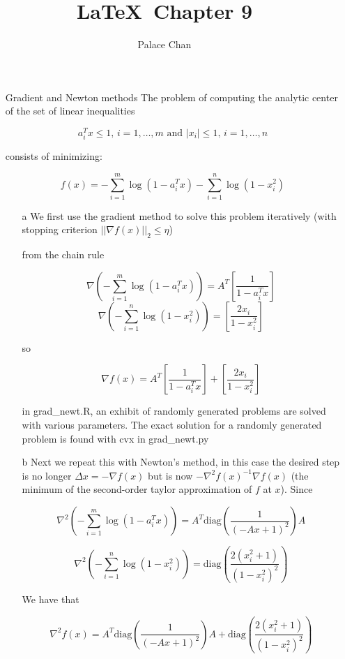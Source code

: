 \documentclass[12pt]{article}
\title{\LaTeX\ Chapter 9}
\author{Palace Chan}
\begin{document}
\maketitle
\newpage

\begin{itemize}

\item[Gradient and Newton methods]
  The problem of computing the analytic center of the set of linear inequalities

  $$a_i^T x \leq 1 \text{,    } i = 1,\ldots,m \text{  and  } |x_i| \leq 1 \text{,    } i = 1,\ldots,n$$

  consists of minimizing:

  $$f(x) = - \sum_{i=1}^m \log (1 - a_i^T x) - \sum_{i=1}^n \log (1 - x_i^2)$$

  \begin{itemize}
  \item[a]
    We first use the gradient method to solve this problem iteratively (with stopping criterion $|| \nabla f(x) ||_2 \leq \eta$)

    from the chain rule
    
    $$\nabla \left(-\sum_{i=1}^m \log (1 - a_i^T x)\right) = A^T \left[ \frac{1}{1-a_i^T x} \right]$$
    $$\nabla \left(-\sum_{i=1}^n \log (1 - x_i^2)\right) = \left[ \frac{2 x_i}{1 - x_i^2} \right]$$

    so

    $$\nabla f(x) = A^T \left[ \frac{1}{1-a_i^T x} \right] + \left[ \frac{2 x_i}{1 - x_i^2} \right]$$

    in grad_newt.R, an exhibit of randomly generated problems are solved with various parameters.
    The exact solution for a randomly generated problem is found with cvx in grad_newt.py

  \item[b]
    Next we repeat this with Newton's method, in this case the desired step is no longer $\Delta x = - \nabla f(x)$ but is now $-\nabla^2 f(x)^{-1} \nabla f(x)$ (the minimum of the second-order taylor approximation of $f$ at $x$). Since

    $$\nabla^2 \left(-\sum_{i=1}^m \log (1 - a_i^T x)\right) = A^T \text{diag} \left( \frac{1}{(-Ax + 1)^2} \right) A$$

    $$\nabla^2 \left(-\sum_{i=1}^n \log (1 - x_i^2)\right) = \text{diag} \left( \frac{2 (x_i^2 + 1)}{(1 - x_i^2)^2} \right)$$

    We have that

    $$\nabla^2 f(x) = A^T \text{diag} \left( \frac{1}{(-Ax + 1)^2} \right) A + \text{diag} \left( \frac{2 (x_i^2 + 1)}{(1 - x_i^2)^2} \right)$$


\end{itemize}
\end{itemize}
\end{document}
